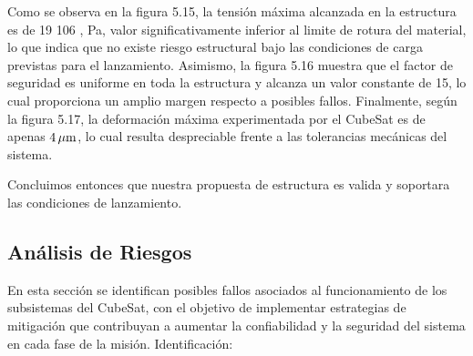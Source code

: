       Como se observa en la figura 5.15, la tensión
      máxima alcanzada en la estructura es de 19  106 , Pa, valor significativamente inferior al
      limite de rotura del material, lo que indica que no existe riesgo estructural bajo las
      condiciones de carga previstas para el lanzamiento. Asimismo, la figura 5.16 muestra que el factor
      de seguridad es uniforme en toda la estructura y alcanza un valor constante de 15, lo cual
      proporciona un amplio margen respecto a posibles fallos. Finalmente, según la figura 5.17,
      la deformación máxima experimentada por el CubeSat es de apenas $4\,\mathrm{\mu m}$, lo cual resulta
      despreciable frente a las tolerancias mecánicas del sistema.

      Concluimos entonces que nuestra propuesta de estructura es valida y soportara las condiciones de lanzamiento.

  \subsection{Análisis de Riesgos}
    En esta sección se identifican posibles fallos asociados al funcionamiento de los subsistemas
    del CubeSat, con el objetivo de implementar estrategias de mitigación que contribuyan a
    aumentar la confiabilidad y la seguridad del sistema en cada fase de la misión. Identificación:

